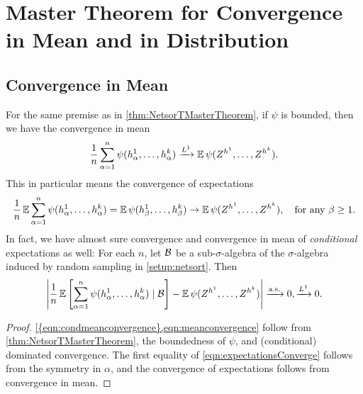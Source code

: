 \documentclass[main.tex]{subfiles}
\begin{document}
\section{\netsort{} Master Theorem for Convergence in Mean and in Distribution}
\label{sec:OtherModesConvergence}

\subsection{Convergence in Mean}

\begin{thm}
\label{thm:NetsorTMeanConvergence}
For the same premise as in \cref{thm:NetsorTMasterTheorem}, if $\psi$ is bounded, then we have the convergence in mean
\begin{equation}
\f 1n\sum_{\alpha=1}^{n}\psi(h_{\alpha}^{1},\ldots,h_{\alpha}^{k})\meanto\EV\psi(Z^{h^{1}},\ldots,Z^{h^{k}}).
\label{eqn:meanconvergence}
\end{equation}
This in particular means the convergence of expectations
\begin{equation}
\f 1n\EV\sum_{\alpha=1}^{n}\psi(h_{\alpha}^{1},\ldots,h_{\alpha}^{k})=\EV\psi(h_{\beta}^{1},\ldots,h_{\beta}^{k})\to\EV\psi(Z^{h^{1}},\ldots,Z^{h^{k}}),\quad\text{for any \ensuremath{\beta\ge1}}.
\label{eqn:expectationsConverge}
\end{equation}
In fact, we have almost sure convergence and convergence in mean of \emph{conditional} expectations as well:
For each $n$, let $\mathcal{B}$ be a sub-$\sigma$-algebra of the $\sigma$-algebra induced by random sampling in \cref{setup:netsort}.
Then
\begin{equation}
\left|\f 1n \EV \left[\sum_{\alpha=1}^{n}\psi(h_{\alpha}^{1},\ldots,h_{\alpha}^{k}) \mid \Bb \right] - \EV\psi(Z^{h^{1}},\ldots,Z^{h^{k}}) \right|
\asto
0, \meanto 0.
\label{eqn:condmeanconvergence}
\end{equation}
\end{thm}

\begin{proof}
    \cref{{eqn:condmeanconvergence},eqn:meanconvergence} follow from \cref{thm:NetsorTMasterTheorem}, the boundedness of $\psi$, and (conditional) dominated convergence.
    The first equality of \cref{eqn:expectationsConverge} follows from the symmetry in $\alpha$, and the convergence of expectations follows from convergence in mean.
\end{proof}
\end{document}
